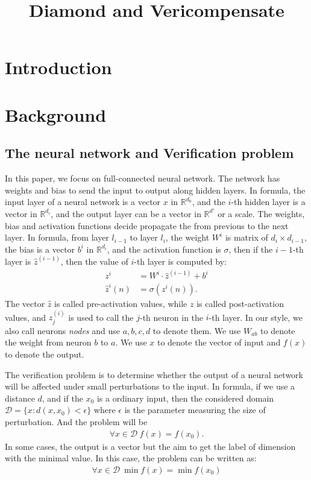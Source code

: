 \documentclass[8pt]{article}
\title{Diamond and Vericompensate}
\date{}
\theoremstyle{definition}
\begin{document}
\maketitle

\section{Introduction}

\section{Background}

\subsection{The neural network and Verification problem}

In this paper, we focus on full-connected neural network. The network has weights and bias to send the input to output along hidden layers. In formula, the input layer of a neural network is a vector $x$ in $\mathbb{R}^{d_0}$, and the $i$-th hidden layer  is a vector in $\mathbb{R}^{d_i}$, and the output layer can be a vector in $\mathbb{R}^{d'}$ or a scale. The weights, bias and activation functions decide propagate the from previous to the next layer. In formula, from layer $l_{i-1}$ to layer $l_{i}$, the weight $W^i$ is matrix of $d_i\times d_{i-1}$, the bias is a vector $b^i$ in $\mathbb{R}^{d_i}$, and the activation function is $\sigma$, then  if the $i-1$-th layer is $\hat{z}^{(i-1)}$, then the value of $i$-th layer is computed by: \begin{align*}
	{z}^{i} &= W^i\cdot \hat{z}^{(i-1)}+ b^i\\
	\hat{z}^{i}(n) &= \sigma({z}^i(n)).
\end{align*} The vector $\hat{z}$ is called pre-activation values, while $z$ is called post-activation values, and $z^{(i)}_j$ is used to call the $j$-th neuron in the $i$-th layer. In our style, we also call neurons \emph{nodes} and use $a,b,c,d$ to denote them. We use $W_{ab}$ to denote the weight from neuron $b$ to $a$. We use $x$ to denote the vector of input and  $f(x)$ to denote the output.


The verification problem is to determine whether the output of a neural network will be affected under small perturbations to the input. In formula, if we use a distance $d$, and if the $x_0$ is a ordinary input, then the considered domain $\mathcal{D}=\{x: d(x,x_0)<\epsilon\}$ where $\epsilon$ is the parameter measuring the size of perturbation. And the problem will be \begin{align*}
	\forall x\in\mathcal{D} \   f(x) = f(x_0).
\end{align*} In some cases, the output is a vector but the aim to get the label of dimension with the minimal value. In this case, the problem can be written as:\begin{align*}
\forall x \in\mathcal{D} \  \min f(x) = \min f(x_0)
\end{align*}
\end{document}
